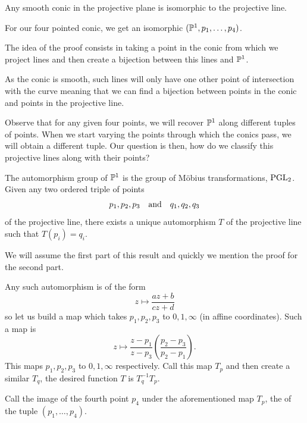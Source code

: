 \documentclass[12pt]{memoir}
\begin{document}
\begin{Prop}%
    Any smooth conic in the projective plane is isomorphic to the projective line.
\end{Prop}

For our four pointed conic, we get an isomorphic $(\mathbb{P}^1,p_1,\dots,p_4)$. 

\begin{ptcb}
    The idea of the proof consists in taking a point in the conic from which we project lines and then create a bijection between this lines and $\mathbb{P}^1$.\par
    As the conic is smooth, such lines will only have one other point of intersection with the curve meaning that we can find a bijection between points in the conic and points in the projective line.
\end{ptcb}

\begin{Rmk}
Observe that for any given four points, we will recover $\mathbb{P}^1$ along different tuples of points. When we start varying the points through which the conics pass, we will obtain a different tuple. Our question is then, how do we classify this projective lines along with their points?
\end{Rmk}

\begin{Th}
    The automorphism group of $\mathbb{P}^1$ is the group of Möbius transformations, $\operatorname{PGL}_2$. Given any two ordered triple of points 
    $$p_1,p_2,p_3\quad\text{and}\quad q_1,q_2,q_3$$
of the projective line, there exists a unique automorphism $T$
 of the projective line such that $T(p_i)=q_i$.
\end{Th}

We will assume the first part of this result and quickly we mention the proof for the second part.

\begin{ptcbp}
Any such automorphism is of the form 
$$z\mapsto \frac{az+b}{cz+d}$$
so let us build a map which takes $p_1,p_2,p_3$ to $0,1,\infty$ (in affine coordinates). Such a map is 
$$z\mapsto\frac{z-p_1}{z-p_3}\left(\frac{p_2-p_3}{p_2-p_1}\right).$$
    This maps $p_1,p_2,p_3$ to $0,1,\infty$ respectively. Call this map $T_p$ and then create a similar $T_q$, the desired function $T$ is $T_q^{-1}T_p$.
\end{ptcbp}

\begin{Def}
    Call the image of the fourth point $p_4$ under the aforementioned map $T_p$, the  of the tuple $(p_1,\dots,p_4)$. 
\end{Def}
\end{document}
